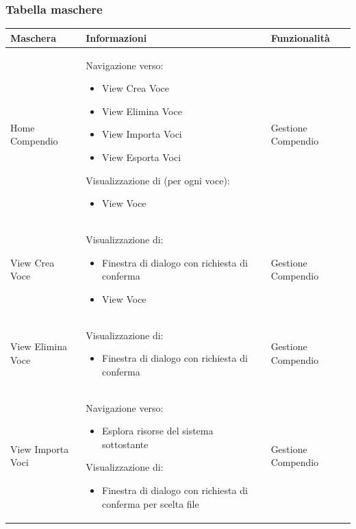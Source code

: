 \documentclass[a4paper, 11pt]{article}
\begin{document}
\subsubsection*{Tabella maschere}
\begin{adjustwidth}{-1.5cm}{-1.5cm}
    \begin{center}
        \begin{longtable}{|p{5cm}|p{5cm}|p{5cm}|}
        \hline
        \textbf{Maschera} & \textbf{Informazioni} & \textbf{Funzionalità} \\ \hline
        Home Compendio & 
        Navigazione verso: 
        \begin{itemize}
            \item View Crea Voce 
            \item View Elimina Voce 
            \item View Importa Voci 
            \item View Esporta Voci
        \end{itemize}
        Visualizzazione di (per ogni voce):
        \begin{itemize}
            \item View Voce
        \end{itemize} & 
        Gestione Compendio \\ \hline
        
        View Crea Voce & 
        Visualizzazione di:
        \begin{itemize}
            \item Finestra di dialogo con richiesta di conferma
            \item View Voce
        \end{itemize} & 
        Gestione Compendio \\ \hline
        
        View Elimina Voce & 
        Visualizzazione di:
        \begin{itemize}
            \item Finestra di dialogo con richiesta di conferma
        \end{itemize} & 
        Gestione Compendio \\ \hline
        
        View Importa Voci & 
        Navigazione verso:
        \begin{itemize}
            \item Esplora risorse del sistema sottostante
        \end{itemize}
        Visualizzazione di:
        \begin{itemize}
            \item Finestra di dialogo con richiesta di conferma per scelta file
        \end{itemize} & 
        Gestione Compendio \\ \hline
        

\end{longtable}
\end{center}
\end{adjustwidth}
\end{document}
